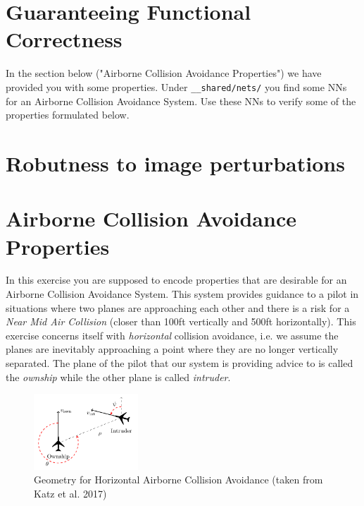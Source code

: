 \documentclass[11pt,fleqn]{article}
\begin{document}
\section*{Guaranteeing Functional Correctness}
In the section below ("Airborne Collision Avoidance Properties") we have provided you with some properties.
Under \texttt{\_\_shared/nets/} you find some NNs for an Airborne Collision Avoidance System.
Use these NNs to verify some of the properties formulated below.

\section*{Robutness to image perturbations}


\clearpage
\section*{Airborne Collision Avoidance Properties}

In this exercise you are supposed to encode properties that are desirable for an
Airborne Collision Avoidance System.
This system provides guidance to a pilot in situations where two planes are approaching each other and there is a risk for a \emph{Near Mid Air Collision} (closer than 100ft vertically and 500ft horizontally).
This exercise concerns itself with \emph{horizontal} collision avoidance, i.e. we assume the planes 
are inevitably approaching a point where they are no longer vertically separated.
The plane of the pilot that our system is providing advice to is called the \emph{ownship} while the other plane is called \emph{intruder}.


\begin{figure}
    \centering
    \includegraphics[width=0.35\textwidth]{figures/acas.png}
    \caption{Geometry for Horizontal Airborne Collision Avoidance (taken from Katz et al. 2017)}
    \label{fig:acas}
\end{figure}
\end{document}
